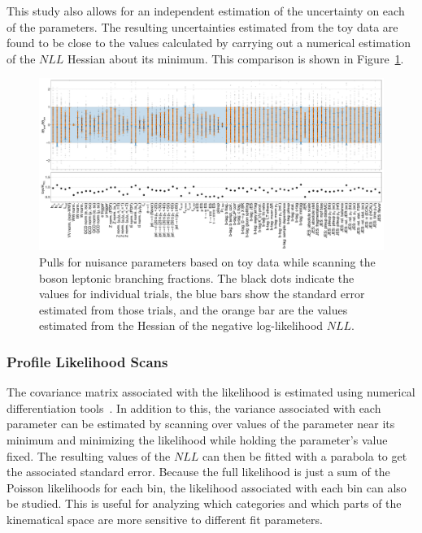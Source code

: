 This study also allows for an independent estimation of the uncertainty on each of the parameters.  The resulting uncertainties estimated from the toy data are found to be close to the values calculated by carrying out a numerical estimation of the $NLL$ Hessian about its minimum.  This comparison is shown in Figure~\ref{fig:analysis:method:mle:pulls_comparison}.

\begin{figure}
    \centering
    \includegraphics[width=0.9\textheight]{chapters/Analysis/sectionStatisticalAnalysis/figures/new_pulls}
    \caption{Pulls for nuisance parameters based on toy data while scanning the \PW boson leptonic branching fractions.  The black dots indicate the values for individual trials, the blue bars show the standard error estimated from those trials, and the orange bar are the values estimated from the Hessian of the negative log-likelihood $NLL$.}
    \label{fig:analysis:method:mle:pulls_comparison}
\end{figure}


\FloatBarrier

\subsubsection{Profile Likelihood Scans}

The covariance matrix associated with the likelihood is estimated using numerical differentiation tools~\cite{numdifftools}.  In addition to this, the variance associated with each parameter can be estimated by scanning over values of the parameter near its minimum and minimizing the likelihood while holding the parameter's value fixed.  The resulting values of the $NLL$ can then be fitted with a parabola to get the associated standard error.  Because the full likelihood is just a sum of the Poisson likelihoods for each bin, the likelihood associated with each bin can also be studied.  This is useful for analyzing which categories and which parts of the kinematical space are more sensitive to different fit parameters.  

